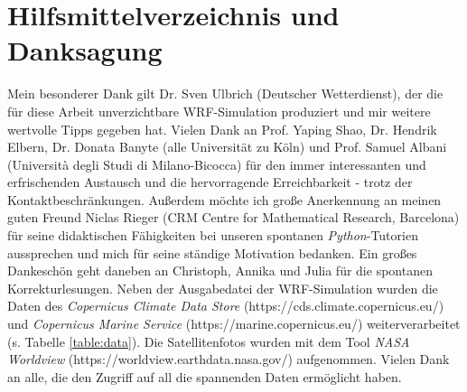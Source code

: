 \documentclass[12pt,a4paper,onecolumn]{scrartcl}
\begin{document}
\section{Hilfsmittelverzeichnis und Danksagung}
Mein besonderer Dank gilt Dr. Sven Ulbrich (Deutscher Wetterdienst), der die für diese Arbeit unverzichtbare WRF-Simulation \glqq produziert\grqq{} und mir weitere wertvolle Tipps gegeben hat. Vielen Dank an Prof. Yaping Shao, Dr. Hendrik Elbern, Dr. Donata Banyte (alle Universität zu Köln) und Prof. Samuel Albani (Università degli Studi di Milano-Bicocca) für den immer interessanten und erfrischenden Austausch und die hervorragende Erreichbarkeit - trotz der Kontaktbeschränkungen. Außerdem möchte ich große Anerkennung an meinen guten Freund Niclas Rieger (CRM Centre for Mathematical Research, Barcelona) für seine didaktischen Fähigkeiten bei unseren spontanen \textit{Python}-Tutorien aussprechen und mich für seine ständige Motivation bedanken. Ein großes Dankeschön geht daneben an Christoph, Annika und Julia für die spontanen Korrekturlesungen. Neben der Ausgabedatei der WRF-Simulation wurden die Daten des \textit{Copernicus Climate Data Store} (https://cds.climate.copernicus.eu/) und \textit{Copernicus Marine Service} (https://marine.copernicus.eu/) weiterverarbeitet (s. Tabelle \ref{table:data}). Die Satellitenfotos wurden mit dem Tool \textit{NASA Worldview} (https://worldview.earthdata.nasa.gov/) aufgenommen. Vielen Dank an alle, die den Zugriff auf all die spannenden Daten ermöglicht haben.
\end{document}
